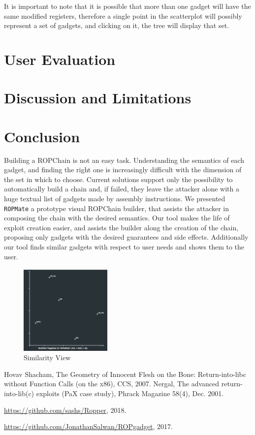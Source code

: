 \documentclass[twocolumn, 11pt]{article}
\begin{document}
It is important to note that it is possible that more than one gadget will have the same modified registers, therefore a single point in the scatterplot will possibly represent a set of gadgets, and clicking on it, the tree will display that set.

\section{User Evaluation}

\section{Discussion and Limitations}

\section{Conclusion}
Building a ROPChain is not an easy task. Understanding the semantics of each gadget, and finding the right one is increasingly difficult with the dimension of the set in which to choose. Current solutions support only the possibility to automatically build a chain and, if failed, they leave the attacker alone with a huge textual list of gadgets made by assembly instructions.
We presented \texttt{ROPMate} a prototype visual ROPChain builder, that assists the attacker in composing the chain with the desired semantics. Our tool makes the life of exploit creation easier, and assists the builder along the creation of the chain, proposing only gadgets with the desired guarantees and side effects. Additionally our tool finds similar gadgets with respect to user needs and shows them to the user.


\begin{figure}[htb]
\centering
 \includegraphics[width=0.4\textwidth]{mds}
 \caption{Similarity View}\label{fig:mds}
\end{figure}



\begin{thebibliography}{99}
    Hovav Shacham,
    The Geometry of Innocent Flesh on the Bone: Return-into-libc without Function Calls (on the x86),
    CCS,
    2007.
    Nergal,
    The advanced return-into-lib(c) exploits (PaX case study),
    Phrack Magazine 58(4),
    Dec. 2001.

     \url{https://github.com/sashs/Ropper},
    2018.

    \url{https://github.com/JonathanSalwan/ROPgadget},
    2017.

\end{thebibliography}
\end{document}
